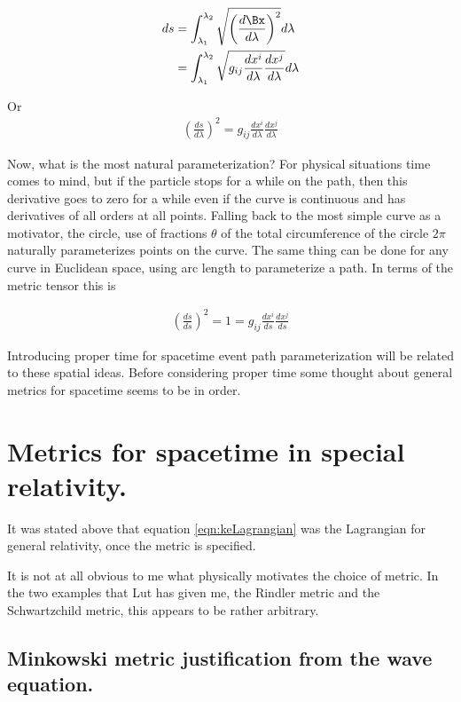 \documentclass{article}      %
\begin{document}
\begin{align*}
ds
&= \int_{\lambda_1}^{\lambda_2} \sqrt{\left(\frac{d\Bx}{d\lambda}\right)^2} d\lambda \\
&= \int_{\lambda_1}^{\lambda_2} \sqrt{ g_{ i j } \frac{dx^i}{d\lambda} \frac{dx^j}{d\lambda} } d\lambda \\
\end{align*}

Or
\begin{align*}
\left(\frac{ds}{d\lambda}\right)^2 = g_{ i j } \frac{dx^i}{d\lambda} \frac{dx^j}{d\lambda}
\end{align*}

Now, what is the most natural parameterization?  For physical situations time comes to mind, but if the particle stops for a
while on the path, then this derivative goes to zero for a while even if the curve is continuous and has derivatives of all
orders at all points.  Falling back to the most simple curve as a motivator, the circle, 
use of fractions $\theta$ of the total circumference of the circle $2\pi$ naturally parameterizes points on the curve.  The same thing can be done for any
curve in Euclidean space, using arc length to parameterize a path.  In terms
of the metric tensor this is

\begin{align*}
\left(\frac{ds}{ds}\right)^2 = 1 = g_{ i j } \frac{dx^i}{ds} \frac{dx^j}{ds}
\end{align*}

Introducing proper time for spacetime event path parameterization will 
be related to these spatial ideas.  Before considering proper time some 
thought about general metrics for spacetime seems to be in order.

\section{ Metrics for spacetime in special relativity. }

It was stated above that equation \ref{eqn:keLagrangian} was the 
Lagrangian for general relativity, once the metric is specified.

It is not
at all obvious to me what physically motivates the choice of metric.
In the two examples that Lut has given me, the Rindler metric and the
Schwartzchild metric, this appears to be rather arbitrary.

\subsection{ Minkowski metric justification from the wave equation. }
\end{document}
